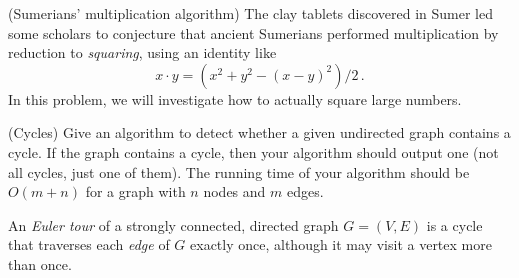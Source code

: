 \begin{questions}

  \question (Sumerians' multiplication algorithm) The clay tablets
  discovered in Sumer led some scholars to conjecture that ancient
  Sumerians performed multiplication by reduction to \emph{squaring},
  using an identity like \[x\cdot y = (x^2 + y^2 - (x - y)^2)/2 \, .\]
  In this problem, we will investigate how to actually square large
  numbers.


  \newpage 
  
  \question[10] (Cycles) Give an algorithm to detect whether a given
  undirected graph contains a cycle. If the graph contains a cycle,
  then your algorithm should output one (not all cycles, just one of
  them). The running time of your algorithm should be $O(m + n)$ for a
  graph with $n$ nodes and $m$ edges.


  \newpage
\question An \emph{Euler tour} of a strongly connected, directed graph
  $G = (V, E)$ is a cycle that traverses each \emph{edge} of $G$
  exactly once, although it may visit a vertex more than once.


\end{questions}




